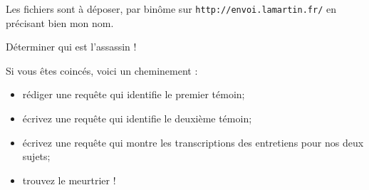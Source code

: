 Les fichiers sont à déposer, par binôme sur \texttt{http://envoi.lamartin.fr/} en précisant bien mon nom.

\vspace{.5cm}

\question{}
Déterminer qui est l'assassin !



Si vous êtes coincés, voici un cheminement :
\begin{itemize}
\item rédiger une requête qui identifie le premier témoin;
\item écrivez une requête qui identifie le deuxième témoin;
\item écrivez une requête qui montre les transcriptions des entretiens pour nos deux sujets;
\item trouvez le meurtrier !
\end{itemize}




\newpage




